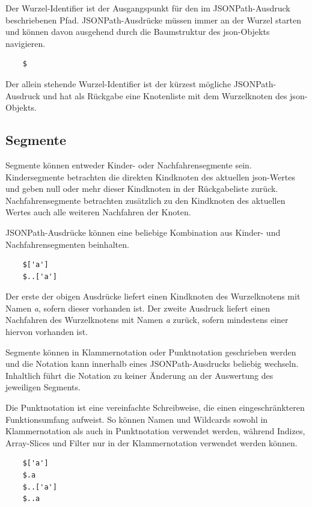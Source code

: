 \documentclass[oneside]{ausarbeitung}
\begin{document}
Der Wurzel-Identifier ist der Ausgangspunkt für den im JSONPath-Ausdruck beschriebenen Pfad. JSONPath-Ausdrücke müssen immer an der Wurzel starten und können davon ausgehend durch die Baumstruktur des \ac{json}-Objekts navigieren.
	
\begin{lstlisting}
	$
\end{lstlisting}
	
Der allein stehende Wurzel-Identifier ist der kürzest mögliche JSONPath-Ausdruck und hat als Rückgabe eine Knotenliste mit dem Wurzelknoten des \ac{json}-Objekts.
	
	
	
\subsection{Segmente}
	
Segmente können entweder Kinder- oder Nachfahrensegmente sein. Kindersegmente betrachten die direkten Kindknoten des aktuellen \ac{json}-Wertes und geben null oder mehr dieser Kindknoten in der Rückgabeliste zurück. Nachfahrensegmente betrachten zusätzlich zu den Kindknoten des aktuellen Wertes auch alle weiteren Nachfahren der Knoten.
	
JSONPath-Ausdrücke können eine beliebige Kombination aus Kinder- und Nachfahrensegmenten beinhalten.
	
\begin{lstlisting}
	$['a']
	$..['a']
\end{lstlisting}
	
Der erste der obigen Ausdrücke liefert einen Kindknoten des Wurzelknotens mit Namen \textit{a}, sofern dieser vorhanden ist. Der zweite Ausdruck liefert einen Nachfahren des Wurzelknotens mit Namen \textit{a} zurück, sofern mindestens einer hiervon vorhanden ist.
	
Segmente können in Klammernotation oder Punktnotation geschrieben werden und die Notation kann innerhalb eines JSONPath-Ausdrucks beliebig wechseln. Inhaltlich führt die Notation zu keiner Änderung an der Auswertung des jeweiligen Segments.
	
Die Punktnotation ist eine vereinfachte Schreibweise, die einen eingeschränkteren Funktionsumfang aufweist. So können Namen und Wildcards sowohl in Klammernotation als auch in Punktnotation verwendet werden, während Indizes, Array-Slices und Filter nur in der Klammernotation verwendet werden können.
	
\begin{lstlisting}
	$['a']
	$.a
	$..['a']
	$..a
\end{lstlisting}
	
\end{document}
